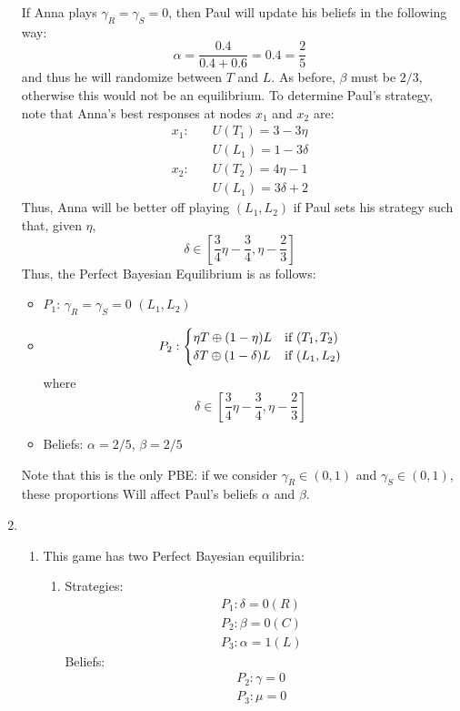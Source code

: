 \documentclass[11pt]{article}
\begin{document}
\begin{enumerate}
	If Anna plays $ \gamma_R  = \gamma_S = 0 $, then Paul will update his beliefs in the following way:
	\[\alpha = \frac{0.4}{0.4 + 0.6} = 0.4 = \frac{2}{5}\]
	and thus he will randomize between $ T $ and $ L $. As before, $\beta$ must be $ 2/3 $, otherwise this would not be an equilibrium. To determine Paul's strategy, note that Anna's best responses at nodes $ x_1 $ and $ x_2 $ are:
	\begin{align*}
	x_1: \quad & U(T_1) = 3 - 3\eta \\
	&U(L_1) = 1 - 3\delta \\
	x_2:\quad & U(T_2) = 4\eta - 1 \\
	& U(L_1) = 3\delta + 2
	\end{align*}
	Thus, Anna will be better off playing $ (L_1, L_2) $ if Paul sets his strategy such that, given $\eta$, 
	\[\delta\in[\frac{3}{4}\eta - \frac{3}{4}, \eta - \frac{2}{3}]\]
	Thus, the Perfect Bayesian Equilibrium is as follows: 
	\begin{itemize}
		\item $ P_1 $: $ \gamma_R = \gamma_S = 0 $ $ (L_1, L_2) $
		\item \[P_2: \begin{cases}
		\eta T \oplus (1 - \eta)L & \text{if $ (T_1, T_2) $} \\
		\delta T \oplus (1 - \delta) L & \text{if $ (L_1, L_2) $}
		\end{cases}\]
		where 
		\[\delta\in[\frac{3}{4}\eta - \frac{3}{4}, \eta - \frac{2}{3}]\]
		\item Beliefs: $\alpha = 2/5$, $ \beta = 2/5 $ 
	\end{itemize}

	Note that this is the only PBE: if we consider $ \gamma_R\in(0,1) $ and $ \gamma_S\in(0,1) $, these proportions Will affect Paul's beliefs $\alpha$ and $\beta$. 
	
	\item \begin{enumerate}
		\item This game has two Perfect Bayesian equilibria:
		\begin{enumerate}[label = \roman*.]
			\item Strategies:
			\begin{gather*}
			P_1: \delta = 0 (R) \\
			P_2: \beta = 0 (C) \\
			P_3: \alpha = 1 (L)
			\end{gather*}
			Beliefs:
			\begin{gather*}
			P_2: \gamma = 0 \\
			P_3: \mu = 0
			\end{gather*}
			

\end{enumerate}
\end{enumerate}
\end{enumerate}
\end{document}
